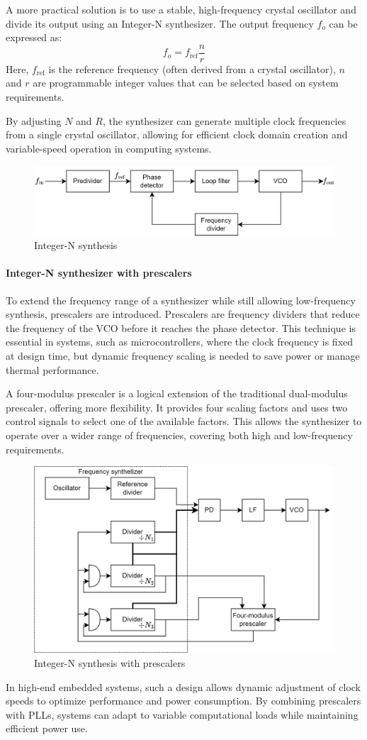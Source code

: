 A more practical solution is to use a stable, high-frequency crystal oscillator and divide its output using an Integer-N synthesizer.
The output frequency $f_{{o}}$ can be expressed as:
\[f_{{o}}=f_{\text{ref}}\dfrac{n}{r}\]
Here, $f_{\text{ref}}$ is the reference frequency (often derived from a crystal oscillator), $n$ and $r$ are programmable integer values that can be selected based on system requirements.

By adjusting $N$ and $R$, the synthesizer can generate multiple clock frequencies from a single crystal oscillator, allowing for efficient clock domain creation and variable-speed operation in computing systems.
\begin{figure}[H]
    \centering
    \includegraphics[width=0.75\linewidth]{images/freqn.png}
    \caption{Integer-N synthesis}
\end{figure}

\paragraph*{Integer-N synthesizer with prescalers}
To extend the frequency range of a synthesizer while still allowing low-frequency synthesis, prescalers are introduced. 
Prescalers are frequency dividers that reduce the frequency of the VCO before it reaches the phase detector. 
This technique is essential in systems, such as microcontrollers, where the clock frequency is fixed at design time, but dynamic frequency scaling is needed to save power or manage thermal performance.

A four-modulus prescaler is a logical extension of the traditional dual-modulus prescaler, offering more flexibility. 
It provides four scaling factors and uses two control signals to select one of the available factors. 
This allows the synthesizer to operate over a wider range of frequencies, covering both high and low-frequency requirements.
\begin{figure}[H]
    \centering
    \includegraphics[width=0.75\linewidth]{images/freqp.png}
    \caption{Integer-N synthesis with prescalers}
\end{figure}
In high-end embedded systems, such a design allows dynamic adjustment of clock speeds to optimize performance and power consumption.
By combining prescalers with PLLs, systems can adapt to variable computational loads while maintaining efficient power use.